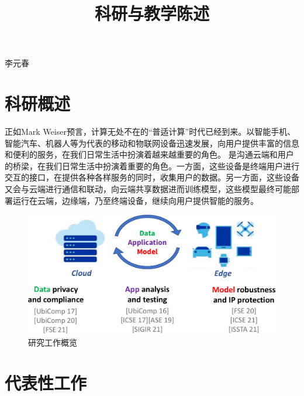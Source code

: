 \documentclass[12pt]{article}
\begin{document}

\title{科研与教学陈述}

\maketitle


\begin{center} {李元春} \end{center}


\section{科研概述}

正如Mark Weiser预言，计算无处不在的“普适计算”时代已经到来。以智能手机、智能汽车、机器人等为代表的移动和物联网设备迅速发展，向用户提供丰富的信息和便利的服务，在我们日常生活中扮演着越来越重要的角色。
是沟通云端和用户的桥梁，在我们日常生活中扮演着重要的角色。一方面，这些设备是终端用户进行交互的接口，在提供各种各样服务的同时，收集用户的数据。另一方面，这些设备又会与云端进行通信和联动，向云端共享数据进而训练模型，这些模型最终可能部署运行在云端，边缘端，乃至终端设备，继续向用户提供智能的服务。

\begin{figure}
    \centering
    \includegraphics[width=6in]{figures/research_overview.pdf}
    \caption{研究工作概览}
    \label{fig:overview}
\end{figure}

\section{代表性工作}
\end{document}
